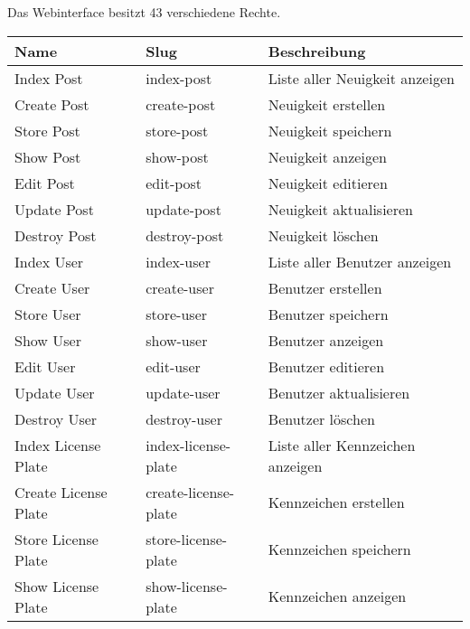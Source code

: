 Das Webinterface besitzt 43 verschiedene Rechte.

\begin{longtable}[c]{@{}lll@{}}
  \toprule
  \textbf{Name}         & \textbf{Slug}         & \textbf{Beschreibung}              \\* \midrule
  \endfirsthead
  \endhead
  \bottomrule
  \endfoot
  \endlastfoot
  Index Post            & index-post            & Liste aller Neuigkeit anzeigen     \\
  Create Post           & create-post           & Neuigkeit erstellen                \\
  Store Post            & store-post            & Neuigkeit speichern                \\
  Show Post             & show-post             & Neuigkeit anzeigen                 \\
  Edit Post             & edit-post             & Neuigkeit editieren                \\
  Update Post           & update-post           & Neuigkeit aktualisieren            \\
  Destroy Post          & destroy-post          & Neuigkeit löschen                  \\
  Index User            & index-user            & Liste aller Benutzer anzeigen      \\
  Create User           & create-user           & Benutzer erstellen                 \\
  Store User            & store-user            & Benutzer speichern                 \\
  Show User             & show-user             & Benutzer anzeigen                  \\
  Edit User             & edit-user             & Benutzer editieren                 \\
  Update User           & update-user           & Benutzer aktualisieren             \\
  Destroy User          & destroy-user          & Benutzer löschen                   \\
  Index License Plate   & index-license-plate   & Liste aller Kennzeichen anzeigen   \\
  Create License Plate  & create-license-plate  & Kennzeichen erstellen              \\
  Store License Plate   & store-license-plate   & Kennzeichen speichern              \\
  Show License Plate    & show-license-plate    & Kennzeichen anzeigen               \\

\end{longtable}
